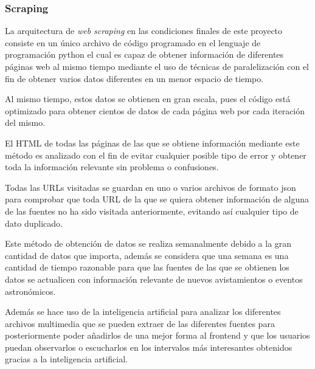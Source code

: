 \subsubsection{Scraping}

La arquitectura de \textit{web scraping} en las condiciones finales de este proyecto consiste en un único archivo de código programado en el lenguaje de programación python el cual es capaz de obtener información de diferentes páginas web al mismo tiempo mediante el uso de técnicas de paralelización con el fin de obtener varios datos diferentes en un menor espacio de tiempo.

Al mismo tiempo, estos datos se obtienen en gran escala, pues el código está optimizado para obtener cientos de datos de cada página web por cada iteración del mismo.

El HTML de todas las páginas de las que se obtiene información mediante este método es analizado con el fin de evitar cualquier posible tipo de error y obtener toda la información relevante sin problema o confusiones.

Todas las URLs visitadas se guardan en uno o varios archivos de formato json para comprobar que toda URL de la que se quiera obtener información de alguna de las fuentes no ha sido visitada anteriormente, evitando así cualquier tipo de dato duplicado.

Este método de obtención de datos se realiza semanalmente debido a la gran cantidad de datos que importa, además se considera que una semana es una cantidad de tiempo razonable para que las fuentes de las que se obtienen los datos se actualicen con información relevante de nuevos avistamientos o eventos astronómicos.

Además se hace uso de la inteligencia artificial para analizar los diferentes archivos multimedia que se pueden extraer de las diferentes fuentes para posteriormente poder añadirlos de una mejor forma al frontend y que los usuarios puedan observarlos o escucharlos en los intervalos más interesantes obtenidos gracias a la inteligencia artificial.
